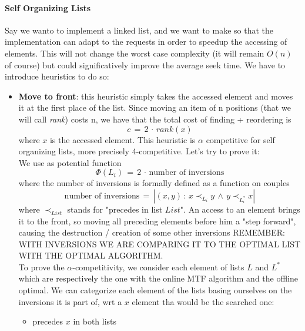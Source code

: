 \documentclass{article}
\begin{document}
		\paragraph{Self Organizing Lists}
			Say we wanto to implement a linked list, and we want to make so that the implementation can adapt to the requests in order to speedup the accessing of elements. This will not change the worst case complexity (it will remain $O(n)$ of course) but could significatively improve the average seek time. We have to introduce heuristics to do so:
			\begin{itemize}
				\item \textbf{Move to front}: this heuristic simply takes the accessed element and moves it at the first place of the list. Since moving an item of n positions (that we will call \textit{rank}) costs n, we have that the total cost of finding + reordering is
					\begin{equation}
						c \,=\, 2 \,\cdot\, rank(x)
					\end{equation}
					where $x$ is the accessed element. This heuristic is $\alpha$ competitive for self organizing lists, more precisely 4-competitive. Let's try to prove it:\\
					We use as potential function
					\begin{equation}
						\Phi(L_i) \,=\, 2 \,\cdot\, \text{number of inversions}
					\end{equation}
					where the number of inversions is formally defined as a function on couples
					\begin{equation}
						\text{number of inversions} \,=\, |(x, y) \,:\, x \prec_{L_i} y \,\wedge\, y \prec_{L_i^*} x |
					\end{equation}
					where $\prec_{List}$ stands for "precedes in list $List$". An access to an element brings it to the front, so moving all preceding elements before him a "step forward", causing the destruction / creation of some other inversions REMEMBER: WITH INVERSIONS WE ARE COMPARING IT TO THE OPTIMAL LIST WITH THE OPTIMAL ALGORITHM.\\
					To prove the $\alpha$-competitivity, we consider each element of lists $L$ and $L^*$ which are respectively the one with the online MTF algorithm and the offline optimal. We can categorize each element of the lists basing ourselves on the inversions it is part of, wrt a $x$ element tha would be the searched one:
					\begin{itemize}
						\item precedes $x$ in both lists

\end{itemize}
\end{itemize}
\end{document}

